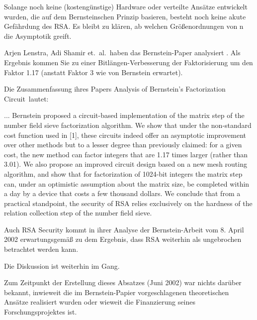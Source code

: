 \begin{refsegment}
Solange noch keine (kostengünstige) Hardware oder verteilte Ansätze
entwickelt wurden, die auf
dem Bernsteinschen Prinzip basieren, besteht noch keine akute Gefährdung
des RSA. Es bleibt zu klären, ab welchen
Größenordnungen von n die Asymptotik greift.

Arjen Lenstra, Adi Shamir et.~al.\ haben das Bernstein-Paper analysiert
\cite{Lenstra2002}.
Als Ergebnis kommen Sie zu einer Bitlängen-Verbesserung der
Faktorisierung um den Faktor 1.17
(anstatt Faktor 3 wie von Bernstein erwartet).

Die Zusammenfassung ihres Papers \glqq Analysis of Bernstein's Factorization
Circuit\grqq~lautet:

\glqq ... Bernstein proposed a circuit-based implementation of
the matrix step of the number field sieve factorization algorithm. We
show that under the non-standard cost function used in [1], these circuits
indeed offer an asymptotic improvement over other methods but
to a lesser degree than previously claimed: for a given cost, the new
method can factor integers that are 1.17 times larger (rather than 3.01).
We also propose an improved circuit design based on a new mesh routing
algorithm, and show that for factorization of 1024-bit integers the
matrix step can, under an optimistic assumption about the matrix size,
be completed within a day by a device that costs a few thousand dollars.
We conclude that from a practical standpoint, the security of RSA relies
exclusively on the hardness of the relation collection step of the number
field sieve.\grqq

Auch RSA Security kommt in ihrer
Analyse der Bernstein-Arbeit \cite{RSA-Security2002} vom 8. April 2002
erwartungsgemäß zu dem Ergebnis, dass RSA weiterhin als ungebrochen betrachtet
werden kann.

Die Diskussion ist weiterhin im Gang.

Zum Zeitpunkt der Erstellung dieses Absatzes (Juni 2002) war nichts
darüber bekannt, inwieweit die im Bernstein-Papier vorgeschlagenen
theoretischen Ansätze realisiert wurden oder wieweit die Finanzierung
seines Forschungsprojektes ist.




\end{refsegment}
